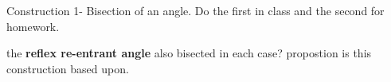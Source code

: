 \begin{question}
Construction 1- Bisection of an angle. Do the first in class and the second for homework.
 
\item
{}
\item 
{}
\itemIs the   \textbf{reflex  re-entrant angle } also bisected in each case?
\itemWhat propostion is this construction based upon.

\end{question}